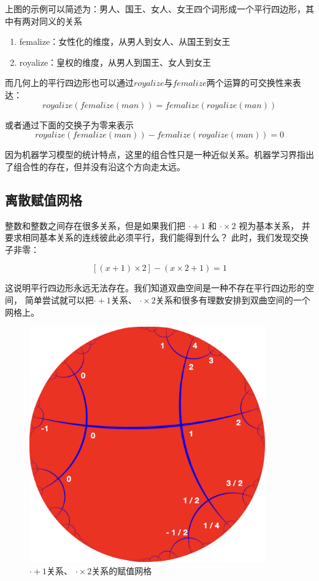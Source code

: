 \documentclass[a4paper,12pt]{article}
\numberwithin{definition}{section}
\numberwithin{lemma}{section}
\numberwithin{proposition}{section}
\numberwithin{theorem}{section}
\numberwithin{grammar}{section}
\numberwithin{program}{section}
\numberwithin{convention}{section}
\numberwithin{corollary}{section}
\begin{document}
上图的示例可以简述为：男人、国王、女人、女王四个词形成一个平行四边形，其中有两对同义的关系
\begin{enumerate}
\item femalize：女性化的维度，从男人到女人、从国王到女王
\item royalize：皇权的维度，从男人到国王、女人到女王
\end{enumerate}

而几何上的平行四边形也可以通过$royalize$与$femalize$两个运算的可交换性来表达：
$$
    royalize(femalize(man)) = femalize(royalize(man))
$$

或者通过下面的交换子为零来表示
$$
    royalize(femalize(man)) - femalize(royalize(man)) = 0
$$

因为机器学习模型的统计特点，这里的组合性只是一种近似关系。机器学习界指出了组合性的存在，但并没有沿这个方向走太远。

\subsection{离散赋值网格}\label{subsec:assignment}

整数和整数之间存在很多关系，但是如果我们把 $\cdot + 1$ 和 $\cdot \times 2$ 视为基本关系，
并要求相同基本关系的连线彼此必须平行，我们能得到什么？ 此时，我们发现交换子非零：

$$
[(x + 1) \times 2] - (x \times 2 + 1) = 1
$$

这说明平行四边形永远无法存在。我们知道双曲空间是一种不存在平行四边形的空间，
简单尝试就可以把$\cdot + 1$关系、 $\cdot \times 2$关系和很多有理数安排到双曲空间的一个网格上。

\begin{figure}[ht]
\centering
\includegraphics[width=4in]{images/assignment2.png}
\caption{$\cdot + 1$关系、 $\cdot \times 2$关系的赋值网格}
\end{figure}
\end{document}
